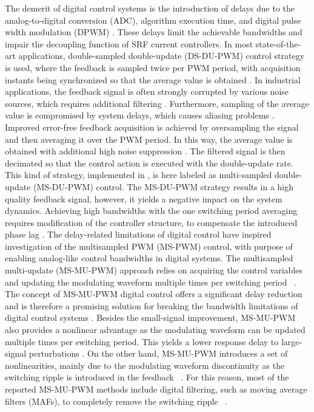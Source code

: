 \documentclass[conference]{IEEEtran}
\begin{document}
The demerit of digital control systems is the introduction of delays due to the analog-to-digital conversion (ADC), algorithm execution time, and digital pulse width modulation (DPWM) \cite{Buso2015}. These delays limit the achievable bandwidths and impair the decoupling function of SRF current controllers. 
In most state-of-the-art applications, double-sampled double-update (DS-DU-PWM) control strategy is used, where the feedback is sampled twice per PWM period, with acquisition instants being synchronized so that the average value is obtained \cite{Buso2015}. In industrial applications, the feedback signal is often strongly corrupted by various noise sources, which requires additional filtering \cite{vuksa2016}. Furthermore, sampling of the average value is compromised by system delays, which causes aliasing problems \cite{Buso2015}.
Improved error-free feedback acquisition is achieved by oversampling the signal and then averaging it over the PWM period. In this way, the average value is obtained with additional high noise suppression \cite{vuksa2016,Petric2020}. The filtered signal is then decimated so that the control action is executed with the double-update rate. This kind of strategy, implemented in \cite{vuksa2016}, is here labeled as multi-sampled double-update (MS-DU-PWM) control. The MS-DU-PWM strategy results in a high quality feedback signal, however, it yields a negative impact on the system dynamics. Achieving high bandwidths with the one switching period averaging requires modification of the controller structure, to compensate the introduced phase lag \cite{vuksa2016}.
The delay-related limitations of digital control have inspired investigation of the multisampled PWM (MS-PWM) control, with purpose of enabling analog-like control bandwidths in digital systems. The multisampled multi-update (MS-MU-PWM) approach relies on acquiring the control variables and updating the modulating waveform multiple times per switching period ~\cite{corradini2018,corradini_analysis,rovere2018,Restrepo2019,Petric2020,Petric2021,Ito2021,He2021}. The concept of MS-MU-PWM digital control offers a significant delay reduction and is therefore a promising solution for breaking the bandwidth limitations of digital control systems \cite{Buso2016}. Besides the small-signal improvement, MS-MU-PWM also provides a nonlinear advantage as the modulating waveform can be updated multiple times per switching period. This yields a lower response delay to large-signal perturbations \cite{corradini_analysis}. On the other hand, MS-MU-PWM introduces a set of nonlinearities, mainly due to the modulating waveform discontinuity as the switching ripple is introduced in the feedback ~\cite{corradini2018,Petric2021}. For this reason, most of the reported MS-MU-PWM methods include digital filtering, such as moving average filters (MAFs), to completely remove the switching ripple ~\cite{Restrepo2019,He2021}.
\end{document}
